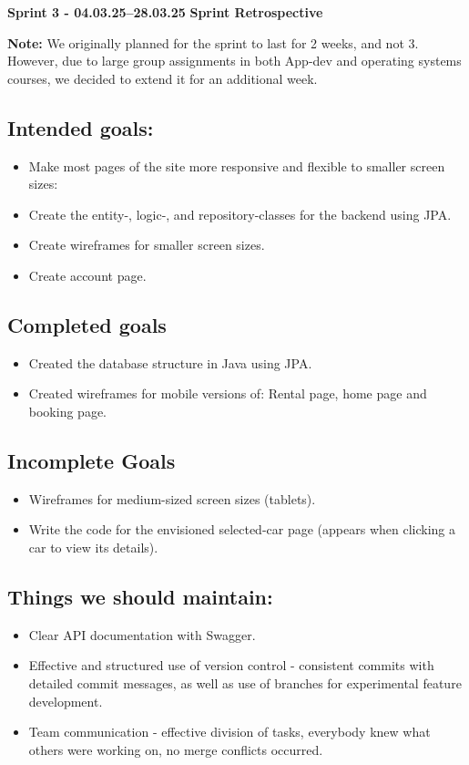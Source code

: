 \documentclass{article}
\begin{document}
\textbf{Sprint 3 - 04.03.25–28.03.25} 
\textbf{Sprint Retrospective} 

\textbf{Note:}
We originally planned for the sprint to last for 2 weeks, and not 3. However, due to large group assignments in both App-dev and operating systems courses, we decided to extend it for an additional week.

\subsection{Intended goals:}
\begin{itemize}
    \item Make most pages of the site more responsive and flexible to smaller screen sizes:
    \item Create the entity-, logic-, and repository-classes for the backend using JPA.
    \item Create wireframes for smaller screen sizes.
    \item Create account page.
\end{itemize}

\subsection{Completed goals}
\begin{itemize}
    \item Created the database structure in Java using JPA.
    \item Created wireframes for mobile versions of: Rental page, home page and booking page.
\end{itemize}

\subsection{Incomplete Goals}
\begin{itemize}
    \item Wireframes for medium-sized screen sizes (tablets).
    \item Write the code for the envisioned selected-car page (appears when clicking a car to view its details).
\end{itemize}
   
\subsection{Things we should maintain:}
\begin{itemize}
    \item Clear API documentation with Swagger.
    \item Effective and structured use of version control - consistent commits with detailed commit messages, as well as use of branches for experimental feature development.
    \item Team communication - effective division of tasks, everybody knew what others were working on, no merge conflicts occurred.
\end{itemize}
\end{document}
